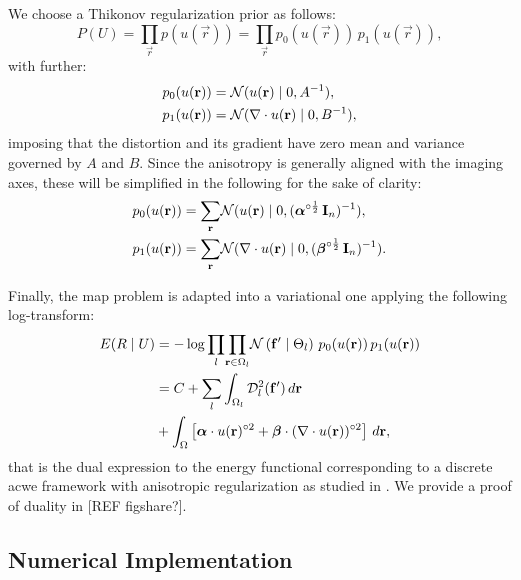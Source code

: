 We choose a Thikonov regularization prior as follows:
  \begin{equation*}
  P(U) = \underset{\vec{r}}{\prod} p(u(\vec{r})) =
  \underset{\vec{r}}{\prod} p_0(u(\vec{r})) \, p_1(u(\vec{r})),
  \end{equation*}
  with further:
  \begin{align*}
  p_0(u(\vec{r})) &= \mathcal{N}( u(\vec{r}) \mid 0, A^{-1}), \notag\\
  p_1(u(\vec{r})) &= \mathcal{N}(  \nabla \cdot u(\vec{r}) \mid 0, B^{-1}),
  \end{align*}
  imposing that the distortion and its gradient have zero
  mean and variance governed by $A$ and $B$.
Since the anisotropy is generally aligned with the imaging axes, these will be simplified
  in the following for the sake of clarity:
  \begin{align}
    p_0(u(\vec{r})) &= \underset{\vec{r}}{\sum} \mathcal{N}( u(\vec{r}) \mid 0,
      (\boldsymbol{\alpha}^{\circ\frac12}\,\vec{I}_n)^{-1}), \notag\\
    p_1(u(\vec{r})) &= \underset{\vec{r}}{\sum} \mathcal{N}( \nabla \cdot u(\vec{r}) \mid 0,
      (\boldsymbol{\beta}^{\circ\frac12}\,\vec{I}_n)^{-1}).
  \label{eq:priors}
  \end{align}

Finally, the \gls{map} problem is adapted into a variational one applying the
  following log-transform:
  \begin{align}
  E(R \mid U) &= -\log \underset{l}{\prod}
  \underset{\vec{r} \in \Omega_l}{\prod}
  \mathcal{N} \left( \vec{f}' \mid \Theta_l \right)\,p_0( u(\vec{r}))\,p_1( u(\vec{r})) \notag\\
  &= C + \underset{l}{\sum} \int_{\Omega_l}
  \mdist{f'}{l} \,d\vec{r} \notag\\
  &+ \int_{\Omega} \left[ \boldsymbol{\alpha} \cdot u(\vec{r})^{\circ2}
  + \boldsymbol{\beta} \cdot (\nabla \cdot u(\vec{r}))^{\circ2} \right] \,d\vec{r},
  \label{eq:energy}
  \end{align}
  that is the dual expression to the energy functional corresponding
  to a discrete \gls*{acwe} framework \citep{chan_active_2001}
  with anisotropic regularization as studied in
  \citep{nagel_investigation_1986}.
We provide a proof of duality in {\color{red} [REF figshare?]}.


\subsection*{Numerical Implementation}
\label{sec:numerical_implementation}

